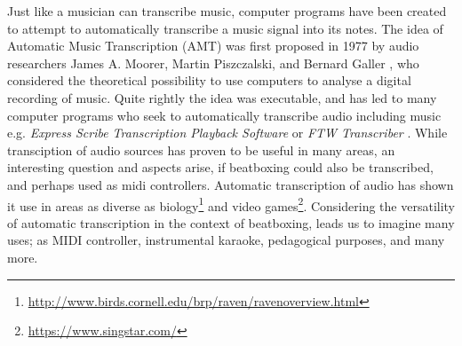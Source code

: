
Just like a musician can transcribe music, computer programs have been created to attempt to automatically transcribe a music signal into its notes. The idea of Automatic Music Transcription (AMT) was first proposed in 1977 by audio researchers James A. Moorer, Martin Piszczalski, and Bernard Galler \citep{Scheirer1998}, who considered the theoretical possibility to use computers to analyse a digital recording of music. Quite rightly the idea was executable, and has led to many computer programs who seek to automatically transcribe audio including music e.g. \textit{ Express Scribe Transcription Playback Software } or \textit{ FTW Transcriber }. While transciption of audio sources has proven to be useful in many areas, an interesting question and aspects arise, if beatboxing could also be transcribed, and perhaps used as midi controllers.
Automatic transcription of audio has shown it use in areas as diverse as biology\footnote{\url{http://www.birds.cornell.edu/brp/raven/ravenoverview.html}} and video games\footnote{\url{https://www.singstar.com/}}. Considering the versatility of automatic transcription in the context of beatboxing, leads us to imagine many uses; as MIDI controller, instrumental karaoke, pedagogical purposes, and many more.





